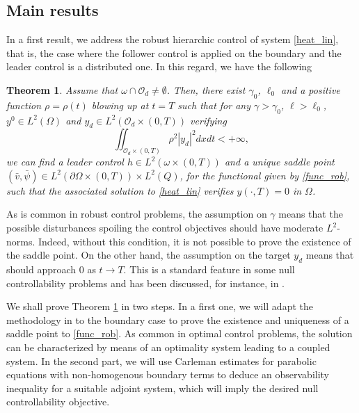\documentclass[preprint,10pt]{article}
\newtheorem{theorem}{Theorem}
\numberwithin{equation}{section}
\numberwithin{theorem}{section}
\begin{document}
{\subsection{Main results}

%

In a first result, we address the robust hierarchic control of system \eqref{heat_lin}, that is, the case where the follower control is applied on the boundary and the leader control is a distributed one. In this regard, we have the following
%
\begin{theorem}\label{teo_main1}
Assume that $\omega\cap\mathcal O_d\neq \emptyset$. Then, there exist $\gamma_0$, $\ell_0$ and a positive function $\rho=\rho(t)$ blowing up at $t=T$ such that for any $\gamma>\gamma_0$, $\ell>\ell_0$, $y^0\in L^2(\Omega)$ and $y_d\in L^2(\mathcal O_d\times(0,T))$ verifying 
%
\begin{equation}\label{integ_yd}
\iint_{\mathcal O_d\times(0,T)}\rho^2|y_d|^2dxdt<+\infty,
\end{equation}
%
we can find a leader control $h\in L^2(\omega\times(0,T))$ and a unique saddle point $(\bar v,\bar\psi)\in L^2(\partial\Omega\times(0,T))\times L^2(Q)$, for the functional given by \eqref{func_rob}, such that the associated solution to \eqref{heat_lin} verifies $y(\cdot,T)=0$ in $\Omega$. 
%
\end{theorem}

As is common in robust control problems, the assumption on $\gamma$ means that the possible disturbances spoiling the control objectives should have moderate $L^2$-norms. Indeed, without this condition, it is not possible to prove the existence of the saddle point. On the other hand, the assumption on the target $y_d$ means that should approach 0 as $t\to T$. This is a standard feature in some null controllability problems and has been discussed, for instance, in \cite{araruna,deteresa2000}. 

We shall prove Theorem \ref{teo_main1} in two steps. In a first one, we will adapt the methodology in \cite{vhs_deT_rob} to the boundary case  to prove the existence and uniqueness of a saddle point to \eqref{func_rob}. As common in optimal control problems, the solution can be characterized by means of an optimality system leading to a coupled system. In the second part, we will use Carleman estimates for parabolic equations with non-homogenous boundary terms to deduce an observability inequality for a suitable adjoint system, which will imply the desired null controllability objective. 

}
\end{document}
